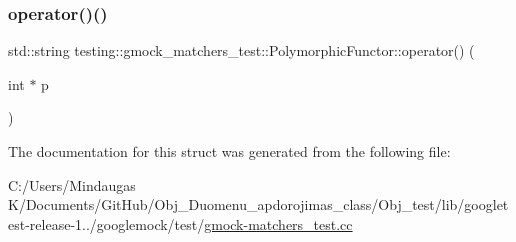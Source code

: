 \mbox{\label{structtesting_1_1gmock__matchers__test_1_1_polymorphic_functor_afadd033a9ae644f159fff6c14a247a70}} 
\subsubsection{\texorpdfstring{operator()()}{operator()()}\hspace{0.1cm}{\footnotesize\ttfamily [3/3]}}
{\footnotesize\ttfamily std\+::string testing\+::gmock\+\_\+matchers\+\_\+test\+::\+Polymorphic\+Functor\+::operator() (\begin{DoxyParamCaption}\item[{int $\ast$}]{p }\end{DoxyParamCaption})\hspace{0.3cm}{\ttfamily [inline]}}



The documentation for this struct was generated from the following file\+:\begin{DoxyCompactItemize}
\item 
C\+:/\+Users/\+Mindaugas K/\+Documents/\+Git\+Hub/\+Obj\+\_\+\+Duomenu\+\_\+apdorojimas\+\_\+class/\+Obj\+\_\+test/lib/googletest-\/release-\/1../googlemock/test/\mbox{\hyperlink{_obj__test_2lib_2googletest-release-1_88_81_2googlemock_2test_2gmock-matchers__test_8cc}{gmock-\/matchers\+\_\+test.\+cc}}\end{DoxyCompactItemize}
